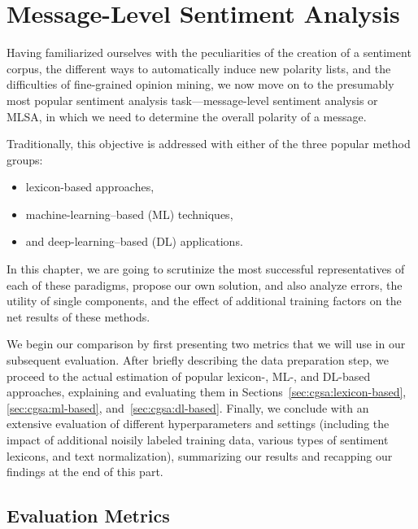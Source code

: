 \chapter{Message-Level Sentiment Analysis}\label{chap:cgsa}

Having familiarized ourselves with the peculiarities of the creation
of a sentiment corpus, the different ways to automatically induce new
polarity lists, and the difficulties of fine-grained opinion mining,
we now move on to the presumably most popular sentiment analysis
task---message-level sentiment analysis or MLSA, in which we need to
determine the overall polarity of a message.

Traditionally, this objective is addressed with either of the three
popular method groups:
\begin{itemize}
  \item lexicon-based approaches,
  \item machine-learning--based (ML) techniques,
  \item and deep-learning--based (DL) applications.
\end{itemize}
In this chapter, we are going to scrutinize the most successful
representatives of each of these paradigms, propose our own solution,
and also analyze errors, the utility of single components, and the
effect of additional training factors on the net results of these
methods.


We begin our comparison by first presenting two metrics that we will
use in our subsequent evaluation.  After briefly describing the data
preparation step, we proceed to the actual estimation of popular
lexicon-, ML-, and DL-based approaches, explaining and evaluating them
in Sections~\ref{sec:cgsa:lexicon-based}, \ref{sec:cgsa:ml-based},
and~\ref{sec:cgsa:dl-based}.  Finally, we conclude with an extensive
evaluation of different hyperparameters and settings (including the
impact of additional noisily labeled training data, various types of
sentiment lexicons, and text normalization), summarizing our results
and recapping our findings at the end of this part.

\section{Evaluation Metrics}\label{sec:cgsa:eval-metrics}

